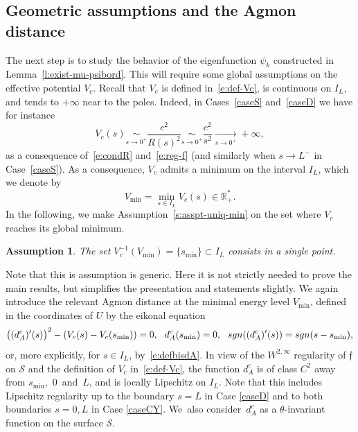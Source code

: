 \documentclass[11pt]{article}
\numberwithin{equation}{section}
\newtheorem{assumption}[lemma]{Assumption}
\theoremstyle{definition}
\newcommand{\calS}{\ensuremath{\mathcal S}}
\newcommand{\mb}[1]{\ensuremath{\mathbb{#1}}}
\newcommand{\R}{{\mb{R}}}
\newcommand{\f}{\ensuremath{\mathfrak{f}}}
\newcommand\sgn{\textnormal{sgn}}
\newcommand{\ce}{c}
\begin{document}
\subsection{Geometric assumptions and the Agmon distance}
The next step is to study the behavior of the eigenfunction $\psi_k$ constructed in Lemma~\ref{l:exist-mu-psibord}. This will require some global assumptions on the effective potential $V_\ce$. Recall that $V_\ce$ is defined in~\eqref{e:def-Vc}, is continuous on $I_L$, and tends to $+\infty$ near to the poles. Indeed, in Cases~\ref{caseS} and~\ref{caseD} we have for instance
\[
V_c(s)\underset{s\to 0^+}\sim\frac{c^2}{R(s)^2}\underset{s\to 0^+}\sim \frac{c^2}{s^2} \underset{s\to 0^+}\to +\infty,
\]
as a consequence of~\eqref{e:condR} and~\eqref{e:reg-f} (and similarly when $s\to L^-$ in Case~\ref{caseS}).
As a consequence, $V_\ce$ admits a minimum on the interval $I_L$, which we denote by
\[
V_{\min} = \min_{s \in I_L} V_\ce(s) \in \R_+^*.
\]
In the following, we make Assumption~\eqref{s:asspt-uniq-min} on the set where $V_\ce$ reaches its global minimum.
\begin{assumption}
\label{a:single-min}
The set $V_{\ce}^{-1}(V_{\min}) = \{s_{\min}\} \subset I_L$ consists in a single point.
\end{assumption}
Note that this is assumption is generic. Here it is not strictly needed to prove the main results, but simplifies the presentation and statements slightly.
We again introduce the relevant Agmon distance at the minimal energy level $V_{\min}$, defined in the coordinates of $U$ by the eikonal equation
\[
\big((d_A^{\ce})'(s) \big)^2-\left( V_\ce(s)- V_\ce(s_{\min}) \right) = 0, \ \ d_A^{\ce}(s_{\min})=0, \ \ \sgn((d_A^{\ce})'(s)) =\sgn(s-s_{\min}),
\]
or, more explicitly, for $s\in I_L$, by~\eqref{e:defbisdA}.
In view of the $W^{2,\infty}$ regularity of $\f$ on $\calS$ and the definition of $V_\ce$ in~\eqref{e:def-Vc}, the function $d_A^{\ce}$ is of class $C^2$ away from $s_{\min}$,~$0$~and~$L$, and is locally Lipschitz on $I_L$. Note that this includes Lipschitz regularity up to the boundary $s=L$ in Case \ref{caseD} and to both boundaries $s=0,L$ in Case \ref{caseCY}.
We~also consider~$d_A^{\ce}$ as a $\theta$-invariant function on the surface $\calS$.
\end{document}
